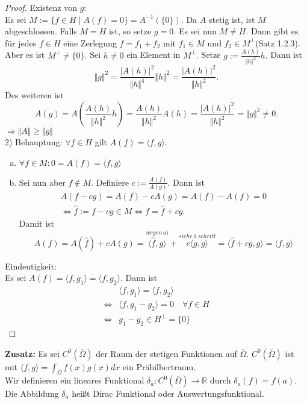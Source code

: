 \documentclass[12pt,titlepage]{article}
\numberwithin{equation}{section}
\begin{document}
\begin{proof}
Existenz von $g$:\\
Es sei $M:=\{f\in H\mid A(f)=0\}=A^{-1}(\{0\})$. Da $A$ stetig ist, ist $M$ abgeschlossen. Falls $M=H$ ist, so setze $g=0.$ Es sei nun $M\neq H.$ Dann gibt es für jedes $f \in H$ eine Zerlegung $f=f_1+f_2$ mit $f_1\in M$ und $f_2 \in M^{\perp}$(Satz 1.2.3).\\
Aber es ist $M^{\perp}\neq \{0\}.$ Sei $h\neq 0$ ein Element in $M^{\perp}.$ Setze $g:=\frac{A(h)}{\Vert h \Vert^2}h.$ Dann ist
\[
\Vert g \Vert^2=\frac{\vert A(h)\vert^2}{\Vert h \Vert^4}\Vert h \Vert ^2=\frac{\vert A(h)\vert^2}{\Vert h \Vert^2}.
\]Des weiteren ist 
\[ 
A(g)=A(\frac{A(h)}{\Vert h \Vert^2}h)=\frac{A(h)}{\Vert h \Vert^2}A(h)=\frac{\vert A(h)\vert^2}{\Vert h \Vert^2}=\Vert g \Vert^2 \neq 0 .
\]$\Rightarrow \Vert A \Vert \geq \Vert g \Vert$\\
2) Behauptung: $\forall f\in H$ gilt $A(f)=\langle f,g\rangle.$\\
\begin{enumerate}[(a)]
\item $\forall f\in M: 0=A(f)=\langle f,g \rangle$
\item Sei nun aber $f \notin M.$ Definiere $c:=\frac{A(f)}{A(g)}.$ Dann ist 
\begin{align*}
A(f-cg)=A(f)- cA(g)=A(f)-A(f)=0\\
\Leftrightarrow \hat{f}:=f-cg \in M \Leftrightarrow f=\hat{f}+cg.
\end{align*}
Damit ist 
\[
A(f)=A(\hat{f})+cA(g)=\overset{wegen\, a)}{\langle \hat{f},g\rangle}+ \overset{siehe\, 1. schritt}{c\langle g,g\rangle}=\langle \hat{f}+cg,g \rangle=\langle f,g \rangle
\]
\end{enumerate}
Eindeutigkeit:\\
Es sei $A(f)=\langle f, g_1 \rangle = \langle f,g_2 \rangle.$
Dann ist 
\begin{align*}
&\langle f, g_1 \rangle = \langle f,g_2 \rangle\\
\Leftrightarrow &\langle f, g_1-g_2 \rangle =0 \quad \forall f \in H\\
\Leftrightarrow & g_1-g_2 \in H^{\perp}=\{0\}
\end{align*}
\end{proof}
\textbf{Zusatz:}
Es sei $C^0 (\overline{\Omega})$ der Raum der stetigen Funktionen auf $\overline{\Omega}$. $C^0 (\overline{\Omega})$ ist mit $\langle f,g \rangle = \int_{\Omega} f(x)g(x) dx$ ein Prähilbertraum.\\
Wir definieren ein lineares Funktional $\delta_a:C^0 (\overline{\Omega})\to \mathbb{R}$ durch $\delta_a (f)=f(a).$ Die Abbildung $\delta_a$ heißt Dirac Funktional oder Auswertungsfunktional.
\end{document}
